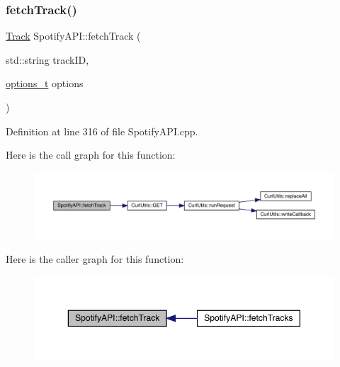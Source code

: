 \subsubsection{\texorpdfstring{fetch\+Track()}{fetchTrack()}}
{\footnotesize\ttfamily \mbox{\hyperlink{class_track}{Track}} Spotify\+A\+P\+I\+::fetch\+Track (\begin{DoxyParamCaption}\item[{std\+::string}]{track\+ID,  }\item[{\mbox{\hyperlink{_spotify_a_p_i_8h_a0ff5cac1a4007bb330b7d9939650c283}{options\+\_\+t}}}]{options }\end{DoxyParamCaption})}



Definition at line 316 of file Spotify\+A\+P\+I.\+cpp.

Here is the call graph for this function\+:
\nopagebreak
\begin{figure}[H]
\begin{center}
\leavevmode
\includegraphics[width=350pt]{class_spotify_a_p_i_a3244fda7378b2315accdf00f2d22e40f_cgraph}
\end{center}
\end{figure}
Here is the caller graph for this function\+:
\nopagebreak
\begin{figure}[H]
\begin{center}
\leavevmode
\includegraphics[width=350pt]{class_spotify_a_p_i_a3244fda7378b2315accdf00f2d22e40f_icgraph}
\end{center}
\end{figure}
\mbox{\label{class_spotify_a_p_i_aa075dad1790b6cdc0cbd29648b65bfef}} 
